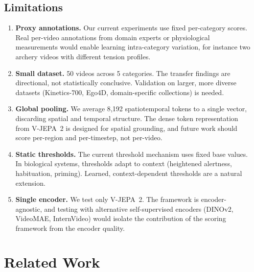 \documentclass[11pt]{article}
\begin{document}
\subsection{Limitations}

\begin{enumerate}
    \item \textbf{Proxy annotations.} Our current experiments use fixed per-category scores. Real per-video annotations from domain experts or physiological measurements would enable learning intra-category variation, for instance two archery videos with different tension profiles.

    \item \textbf{Small dataset.} 50 videos across 5 categories. The transfer findings are directional, not statistically conclusive. Validation on larger, more diverse datasets (Kinetics-700, Ego4D, domain-specific collections) is needed.

    \item \textbf{Global pooling.} We average 8{,}192 spatiotemporal tokens to a single vector, discarding spatial and temporal structure. The dense token representation from V-JEPA~2 is designed for spatial grounding, and future work should score per-region and per-timestep, not per-video.

    \item \textbf{Static thresholds.} The current threshold mechanism uses fixed base values. In biological systems, thresholds adapt to context (heightened alertness, habituation, priming). Learned, context-dependent thresholds are a natural extension.

    \item \textbf{Single encoder.} We test only V-JEPA~2. The framework is encoder-agnostic, and testing with alternative self-supervised encoders (DINOv2, VideoMAE, InternVideo) would isolate the contribution of the scoring framework from the encoder quality.
\end{enumerate}

\section{Related Work}
\end{document}
